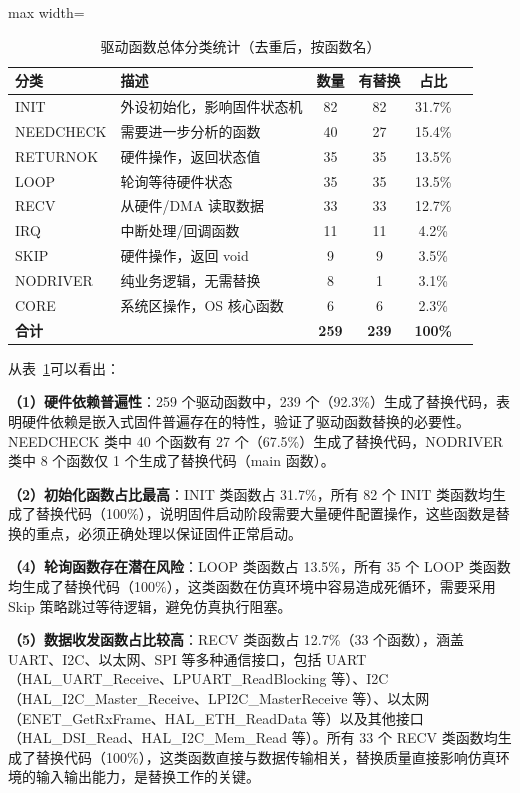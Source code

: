 \begin{table}[htbp]
\centering
\caption{驱动函数总体分类统计（去重后，按函数名）}
\label{tab:overall_classification}
\small
\begin{adjustbox}{max width=\textwidth}
\begin{tabular}{llcccc}
\toprule
\textbf{分类} & \textbf{描述} & \textbf{数量} & \textbf{有替换} & \textbf{占比} \\
\midrule
INIT & 外设初始化，影响固件状态机 & 82 & 82 & 31.7\% \\
NEEDCHECK & 需要进一步分析的函数 & 40 & 27 & 15.4\% \\
RETURNOK & 硬件操作，返回状态值 & 35 & 35 & 13.5\% \\
LOOP & 轮询等待硬件状态 & 35 & 35 & 13.5\% \\
RECV & 从硬件/DMA 读取数据 & 33 & 33 & 12.7\% \\
IRQ & 中断处理/回调函数 & 11 & 11 & 4.2\% \\
SKIP & 硬件操作，返回 void & 9 & 9 & 3.5\% \\
NODRIVER & 纯业务逻辑，无需替换 & 8 & 1 & 3.1\% \\
CORE & 系统区操作，OS 核心函数 & 6 & 6 & 2.3\% \\
\midrule
\textbf{合计} & & \textbf{259} & \textbf{239} & \textbf{100\%} \\
\bottomrule
\end{tabular}
\end{adjustbox}
\end{table}

从表~\ref{tab:overall_classification}可以看出：

\textbf{（1）硬件依赖普遍性}：259 个驱动函数中，239 个（92.3\%）生成了替换代码，表明硬件依赖是嵌入式固件普遍存在的特性，验证了驱动函数替换的必要性。NEEDCHECK 类中 40 个函数有 27 个（67.5\%）生成了替换代码，NODRIVER 类中 8 个函数仅 1 个生成了替换代码（main 函数）。

\textbf{（2）初始化函数占比最高}：INIT 类函数占 31.7\%，所有 82 个 INIT 类函数均生成了替换代码（100\%），说明固件启动阶段需要大量硬件配置操作，这些函数是替换的重点，必须正确处理以保证固件正常启动。

\textbf{（4）轮询函数存在潜在风险}：LOOP 类函数占 13.5\%，所有 35 个 LOOP 类函数均生成了替换代码（100\%），这类函数在仿真环境中容易造成死循环，需要采用 Skip 策略跳过等待逻辑，避免仿真执行阻塞。

\textbf{（5）数据收发函数占比较高}：RECV 类函数占 12.7\%（33 个函数），涵盖 UART、I2C、以太网、SPI 等多种通信接口，包括 UART（HAL\_UART\_Receive、LPUART\_ReadBlocking 等）、I2C（HAL\_I2C\_Master\_Receive、LPI2C\_MasterReceive 等）、以太网（ENET\_GetRxFrame、HAL\_ETH\_ReadData 等）以及其他接口（HAL\_DSI\_Read、HAL\_I2C\_Mem\_Read 等）。所有 33 个 RECV 类函数均生成了替换代码（100\%），这类函数直接与数据传输相关，替换质量直接影响仿真环境的输入输出能力，是替换工作的关键。



